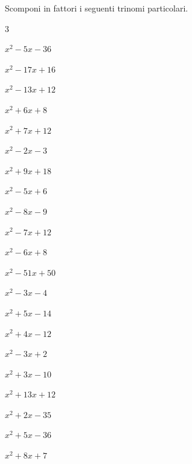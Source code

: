 \begin{esercizio}
\label{ese:17.1}
Scomponi in fattori i seguenti trinomi particolari.
\begin{htmulticols}{3}
\begin{enumeratea}
\item \(x^{2}-5x-36\)
\item \(x^{2}-17x+16\)
\item \(x^{2}-13x+12\)
\item \(x^{2}+6x+8\)
\item \(x^{2}+7x+12\)
\item \(x^{2}-2x-3\)
\item \(x^{2}+9x+18\)
\item \(x^{2}-5x+6\)
\item \(x^{2}-8x-9\)
\item \(x^{2}-7x+12\)
\item \(x^{2}-6x+8\)
\item \(x^{2}-51x+50\)
\item \(x^{2}-3x-4\)
\item \(x^{2}+5x-14\)
\item \(x^{2}+4x-12\)
\item \(x^{2}-3x+2\)
\item \(x^{2}+3x-10\)
\item \(x^{2}+13x+12\)
\item \(x^{2}+2x-35\)
\item \(x^{2}+5x-36\)
\item \(x^{2}+8x+7\)
\end{enumeratea}
\end{htmulticols}
\end{esercizio}

